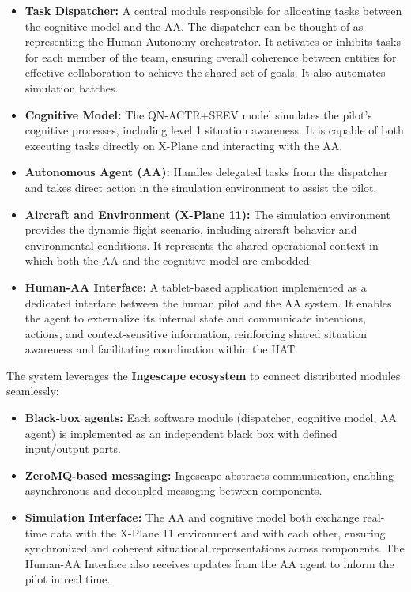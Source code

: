 \documentclass[12pt,a4paper]{article} %
\begin{document}
	\begin{itemize} 
		\item \textbf{Task Dispatcher:} A central module responsible for allocating tasks between the cognitive model and the AA. The dispatcher can be thought of as representing the Human-Autonomy orchestrator. It activates or inhibits tasks for each member of the team, ensuring overall coherence between entities for effective collaboration to achieve the shared set of goals. It also automates simulation batches.
		
		\item \textbf{Cognitive Model:} The QN-ACTR+SEEV model simulates the pilot's cognitive processes, including level 1 situation awareness. It is capable of both executing tasks directly on X-Plane and interacting with the AA.
	
		\item \textbf{Autonomous Agent (AA):} Handles delegated tasks from the dispatcher and takes direct action in the simulation environment to assist the pilot.
	
		\item \textbf{Aircraft and Environment (X-Plane 11):} The simulation environment provides the dynamic flight scenario, including aircraft behavior and environmental conditions. It represents the shared operational context in which both the AA and the cognitive model are embedded.
	
		\item \textbf{Human-AA Interface:} A tablet-based application implemented as a dedicated interface between the human pilot and the AA system. It enables the agent to externalize its internal state and communicate intentions, actions, and context-sensitive information, reinforcing shared situation awareness and facilitating coordination within the HAT.
	\end{itemize}
	
	The system leverages the \textbf{Ingescape ecosystem} to connect distributed modules seamlessly:
	\begin{itemize}
		\item \textbf{Black-box agents:} Each software module (dispatcher, cognitive model, AA agent) is implemented as an independent black box with defined input/output ports.
	
		\item \textbf{ZeroMQ-based messaging:} Ingescape abstracts communication, enabling asynchronous and decoupled messaging between components.
	
		\item \textbf{Simulation Interface:} The AA and cognitive model both exchange real-time data with the X-Plane 11 environment and with each other, ensuring synchronized and coherent situational representations across components. The Human-AA Interface also receives updates from the AA agent to inform the pilot in real time.
	\end{itemize}
	
\end{document}
